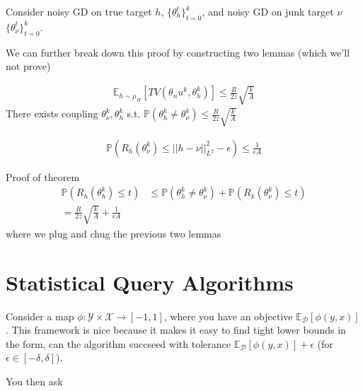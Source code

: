 Consider noisy GD on true target $h$, $\{\theta_h^t\}_{t=0}^k$, and noisy GD on junk target $\nu$ $\{\theta_\nu^t\}_{t=0}^k$.

We can further break down this proof by constructing two lemmas (which we'll not prove)
\begin{lemma}
	\begin{align}
		\mathbb E_{h \sim \mu_H}[TV(\theta_nu^k, \theta_h^k)] \leq \frac{R}{2z} \sqrt{\frac{k}{A}}
 	\end{align}
 	There exists coupling $\theta_\nu^k, \theta_h^k$ s.t. $\mathbb P(\theta_h^k \neq \theta_\nu^k) \leq \frac{R}{2z} \sqrt{\frac{k}{A}}$
\end{lemma}
\begin{lemma}
	\begin{align}
		\mathbb P(R_h(\theta_\nu^k) \leq ||h - \nu||_{L^2}^2 - \epsilon) \leq \frac{1}{\epsilon A}
	\end{align}
\end{lemma}
Proof of theorem
\begin{align}
	\mathbb P(R_h(\theta_h^k)\leq t) & \leq \mathbb P(\theta_h^k \neq \theta_\nu^k) + \mathbb P(R_k(\theta^k_\nu) \leq t)\\
	= \frac{R}{2z} \sqrt{\frac{k}{A}} + \frac{1}{\epsilon A}
\end{align}
where we plug and chug the previous two lemmas



\section{Statistical Query Algorithms}
Consider a map $\phi: \mathcal Y \times \mathcal X \to [-1, 1]$, where you have an objective $\mathbb E_{\mathcal D} [\phi(y,x)]$. This framework is nice because it makes it easy to find tight lower bounds in the form, can the algorithm succseed with tolerance $\mathbb E_{\mathcal D}[\phi(y,x)] + \epsilon$ (for $\epsilon \in [- \delta, \delta]$).

You then ask 


















